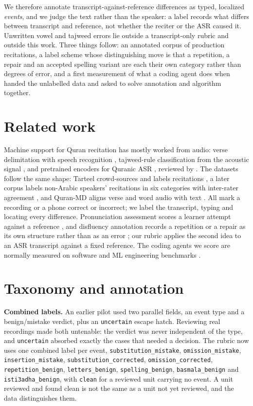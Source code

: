 \documentclass{article}
\begin{document}
We therefore annotate transcript-against-reference differences as typed, localized \emph{events}, and we judge the text rather than the speaker: a label records what differs between transcript and reference, not whether the reciter or the ASR caused it. Unwritten vowel and tajweed errors lie outside a transcript-only rubric and outside this work. Three things follow: an annotated corpus of production recitations, a label scheme whose distinguishing move is that a repetition, a repair and an accepted spelling variant are each their own category rather than degrees of error, and a first measurement of what a coding agent does when handed the unlabelled data and asked to solve annotation and algorithm together.

\section{Related work}
Machine support for Quran recitation has mostly worked from audio: verse delimitation with speech recognition \citep{tabbal2006recitation}, tajweed-rule classification from the acoustic signal \citep{alagrami2021smartajweed}, and pretrained encoders for Quranic ASR \citep{alharbi2026comparative}, reviewed by \citet{farghaly2021asrreview}. The datasets follow the same shape: Tarteel crowd-sources and labels recitations \citep{yousfi2018tarteel}, a later corpus labels non-Arabic speakers' recitations in six categories with inter-rater agreement \citep{salameh2024quranic}, and Quran-MD aligns verse and word audio with text \citep{salman2026quranmd}. All mark a recording or a phone correct or incorrect; we label the transcript, typing and locating every difference. Pronunciation assessment scores a learner attempt against a reference \citep{witt2000goodness}, and disfluency annotation records a repetition or a repair as its own structure rather than as an error \citep{shriberg1994}; our rubric applies the second idea to an ASR transcript against a fixed reference. The coding agents we score are normally measured on software and ML engineering benchmarks \citep{jimenez2024swebench,chan2024mlebench}.

\section{Taxonomy and annotation}\label{sec:taxonomy}
\textbf{Combined labels.} An earlier pilot used two parallel fields, an event type and a benign/mistake verdict, plus an \texttt{uncertain} escape hatch. Reviewing real recordings made both untenable: the verdict was never independent of the type, and \texttt{uncertain} absorbed exactly the cases that needed a decision. The rubric now uses one combined label per event, \texttt{substitution\_mistake}, \texttt{omission\_mistake}, \texttt{insertion\_mistake}, \texttt{substitution\_corrected}, \texttt{omission\_corrected}, \texttt{repetition\_benign}, \texttt{letters\_benign}, \texttt{spelling\_benign}, \texttt{basmala\_benign} and \texttt{isti3adha\_benign}, with \texttt{clean} for a reviewed unit carrying no event. A unit reviewed and found clean is not the same as a unit not yet reviewed, and the data distinguishes them.
\end{document}
